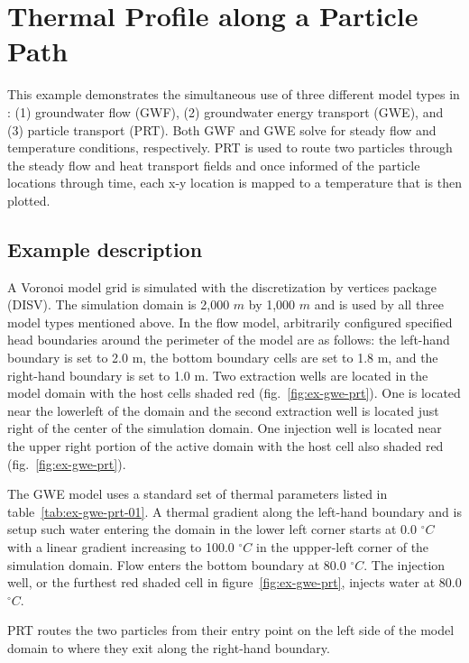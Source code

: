 \section{Thermal Profile along a Particle Path}

This example demonstrates the simultaneous use of three different model types in \mf: (1) groundwater flow (GWF), (2) groundwater energy transport (GWE), and (3) particle transport (PRT).  Both GWF and GWE solve for steady flow and temperature conditions, respectively. PRT is used to route two particles through the steady flow and heat transport fields and once informed of the particle locations through time, each x-y location is mapped to a temperature that is then plotted.

\subsection{Example description}

A Voronoi model grid is simulated with the discretization by vertices package (DISV).  The simulation domain is 2,000 $m$ by 1,000 $m$ and is used by all three model types mentioned above.  In the flow model, arbitrarily configured specified head boundaries around the perimeter of the model are as follows: the left-hand boundary is set to 2.0 m, the bottom boundary cells are set to 1.8 m, and the right-hand boundary is set to 1.0 m.  Two extraction wells are located in the model domain with the host cells shaded red ({fig.~\ref{fig:ex-gwe-prt}}).  One is located near the lowerleft of the domain and the second extraction well is located just right of the center of the simulation domain.  One injection well is located near the upper right portion of the active domain with the host cell also shaded red ({fig.~\ref{fig:ex-gwe-prt}}). 

The GWE model uses a standard set of thermal parameters listed in table~\ref{tab:ex-gwe-prt-01}.  A thermal gradient along the left-hand boundary and is setup such water entering the domain in the lower left corner starts at 0.0 $^{\circ}C$ with a linear gradient increasing to 100.0 $^{\circ}C$ in the uppper-left corner of the simulation domain.  Flow enters the bottom boundary at 80.0 $^{\circ}C$.  The injection well, or the furthest red shaded cell in figure~\ref{fig:ex-gwe-prt}, injects water at 80.0 $^{\circ}C$.

PRT routes the two particles from their entry point on the left side of the model domain to where they exit along the right-hand boundary.

